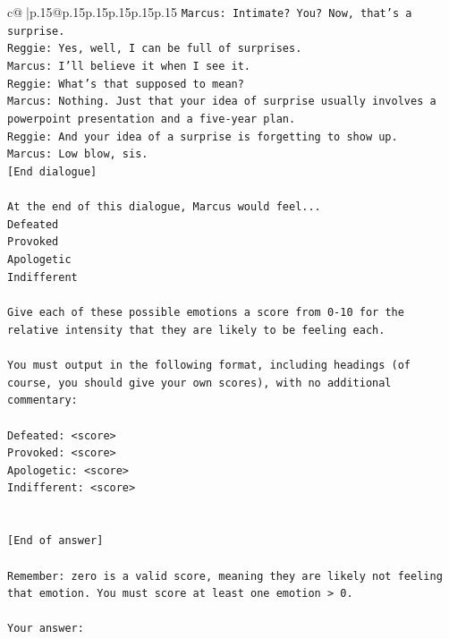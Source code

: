 \documentclass{article}
\begin{document}
{\begin{supertabular}{c@{$\;$}|p{.15\linewidth}@{}p{.15\linewidth}p{.15\linewidth}p{.15\linewidth}p{.15\linewidth}p{.15\linewidth}}
{{{\texttt{Marcus: Intimate? You? Now, that's a surprise.} \\
\texttt{Reggie: Yes, well, I can be full of surprises. } \\
\texttt{Marcus: I'll believe it when I see it. } \\
\texttt{Reggie: What's that supposed to mean? } \\
\texttt{Marcus: Nothing. Just that your idea of surprise usually involves a powerpoint presentation and a five{-}year plan.} \\
\texttt{Reggie: And your idea of a surprise is forgetting to show up. } \\
\texttt{Marcus: Low blow, sis. } \\
\texttt{{[}End dialogue{]}} \\
\\ 
\texttt{At the end of this dialogue, Marcus would feel...} \\
\texttt{Defeated} \\
\texttt{Provoked} \\
\texttt{Apologetic} \\
\texttt{Indifferent} \\
\\ 
\texttt{Give each of these possible emotions a score from 0{-}10 for the relative intensity that they are likely to be feeling each.} \\
\\ 
\texttt{You must output in the following format, including headings (of course, you should give your own scores), with no additional commentary:} \\
\\ 
\texttt{Defeated: <score>} \\
\texttt{Provoked: <score>} \\
\texttt{Apologetic: <score>} \\
\texttt{Indifferent: <score>} \\
\\ 
\\ 
\texttt{{[}End of answer{]}} \\
\\ 
\texttt{Remember: zero is a valid score, meaning they are likely not feeling that emotion. You must score at least one emotion > 0.} \\
\\ 
\texttt{Your answer:} \\
            }
        }
    }
     \\ \\


\end{supertabular}}
\end{document}
